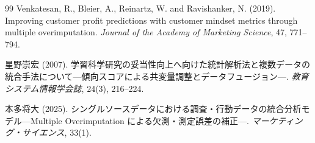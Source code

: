 \documentclass[dvipdfmx,autodetect-engine]{jsarticle}
\newcommand{\1}{\mathbf{1}}
\begin{document}
\begin{thebibliography}{99}
Venkatesan, R., Bleier, A., Reinartz, W. and Ravishanker, N. (2019).
Improving customer profit predictions with customer mindset metrics through multiple overimputation.
\textit{Journal of the Academy of Marketing Science}, 47, 771--794.

星野崇宏 (2007).
学習科学研究の妥当性向上へ向けた統計解析法と複数データの統合手法について---傾向スコアによる共変量調整とデータフュージョン---.
\textit{教育システム情報学会誌}, 24(3), 216--224.

本多将大 (2025).
シングルソースデータにおける調査・行動データの統合分析モデル---Multiple Overimputation による欠測・測定誤差の補正---.
\textit{マーケティング・サイエンス}, 33(1).
\end{thebibliography}
\end{document}

